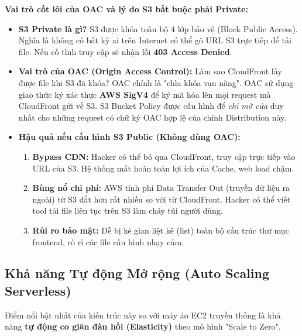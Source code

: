 \documentclass[13pt]{article}
\begin{document}
\textbf{Vai trò cốt lõi của OAC và lý do S3 bắt buộc phải Private:}
\begin{itemize}
    \item \textbf{S3 Private là gì?} S3 được khóa toàn bộ 4 lớp bảo vệ (Block Public Access). Nghĩa là không có bất kỳ ai trên Internet có thể gõ URL S3 trực tiếp để tải file. Nếu cố tình truy cập sẽ nhận lỗi \textbf{403 Access Denied}.
    \item \textbf{Vai trò của OAC (Origin Access Control):} Làm sao CloudFront lấy được file khi S3 đã khóa? OAC chính là "chìa khóa vạn năng". OAC sử dụng giao thức ký xác thực \textbf{AWS SigV4} để ký mã hóa lên mọi request mà CloudFront gửi về S3. S3 Bucket Policy được cấu hình để \textit{chỉ mở cửa} duy nhất cho những request có chữ ký OAC hợp lệ của chính Distribution này.
    \item \textbf{Hậu quả nếu cấu hình S3 Public (Không dùng OAC):}
    \begin{enumerate}
        \item \textbf{Bypass CDN:} Hacker có thể bỏ qua CloudFront, truy cập trực tiếp vào URL của S3. Hệ thống mất hoàn toàn lợi ích của Cache, web load chậm.
        \item \textbf{Bùng nổ chi phí:} AWS tính phí Data Transfer Out (truyền dữ liệu ra ngoài) từ S3 đắt hơn rất nhiều so với từ CloudFront. Hacker có thể viết tool tải file liên tục trên S3 làm cháy túi người dùng.
        \item \textbf{Rủi ro bảo mật:} Dễ bị kẻ gian liệt kê (list) toàn bộ cấu trúc thư mục frontend, rò rỉ các file cấu hình nhạy cảm.
    \end{enumerate}
\end{itemize}

\subsection{Khả năng Tự động Mở rộng (Auto Scaling Serverless)}
Điểm nổi bật nhất của kiến trúc này so với máy ảo EC2 truyền thống là khả năng \textbf{tự động co giãn đàn hồi (Elasticity)} theo mô hình "Scale to Zero".
\end{document}
